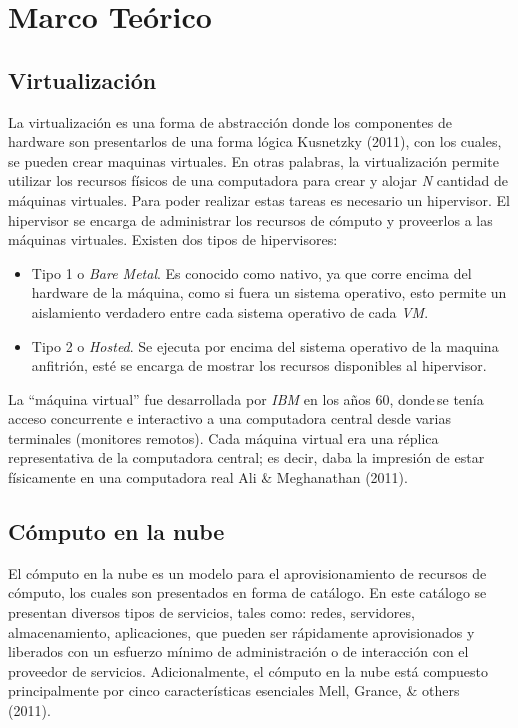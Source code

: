 \documentclass[12pt,twoside]{reedthesis}
\begin{document}
\hypertarget{ref_labels}{%
\chapter{Marco Teórico}\label{ref_labels}}

\hypertarget{virtualizacion}{%
\section{Virtualización}\label{virtualizacion}}

La virtualización es una forma de abstracción donde los componentes de hardware son presentarlos de una forma lógica Kusnetzky (2011), con los cuales, se pueden crear maquinas virtuales.
En otras palabras, la virtualización permite utilizar los recursos físicos de una computadora para crear y alojar \emph{N} cantidad de máquinas virtuales. Para poder realizar estas tareas es necesario un hipervisor. El hipervisor se encarga de administrar los recursos de cómputo y proveerlos a las máquinas virtuales. Existen dos tipos de hipervisores:
\begin{itemize}
\item
  Tipo 1 o \emph{Bare Metal}. Es conocido como nativo, ya que corre encima del hardware de la máquina, como si fuera un sistema operativo, esto permite un aislamiento verdadero entre cada sistema operativo de cada \emph{VM}.
\item
  Tipo 2 o \emph{Hosted}. Se ejecuta por encima del sistema operativo de la maquina anfitrión, esté se encarga de mostrar los recursos disponibles al hipervisor.
\end{itemize}
La ``máquina virtual'' fue desarrollada por \emph{IBM} en los años 60, donde\,se tenía acceso concurrente e interactivo a una computadora central desde varias terminales (monitores remotos). Cada máquina virtual era una réplica representativa de la computadora central; es decir, daba la impresión de estar físicamente en una computadora real Ali \& Meghanathan (2011).~

\hypertarget{computo-en-la-nube}{%
\section{Cómputo en la nube}\label{computo-en-la-nube}}

El cómputo en la nube es un modelo para el aprovisionamiento de recursos de cómputo, los cuales son presentados en forma de catálogo. En este catálogo se presentan diversos tipos de servicios, tales como: redes, servidores, almacenamiento, aplicaciones, que pueden ser rápidamente aprovisionados y liberados con un esfuerzo mínimo de administración o de interacción con el proveedor de servicios. Adicionalmente, el cómputo en la nube está compuesto principalmente por cinco características esenciales Mell, Grance, \& others (2011).~~
\end{document}
